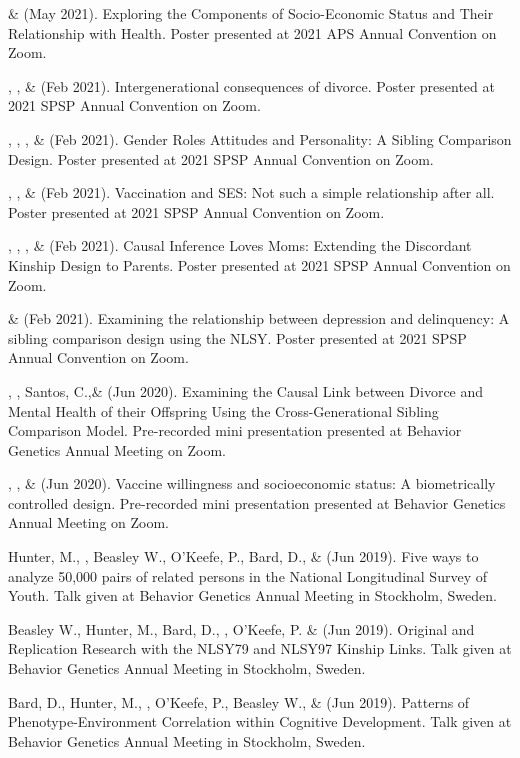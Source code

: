 %
\item \yrh \& \meb (May 2021). Exploring the Components of Socio-Economic Status and Their Relationship with Health. Poster presented at 2021 APS Annual Convention on Zoom.
%
\item \kl, \jt, \& \meb (Feb 2021). Intergenerational consequences of divorce. Poster presented at 2021 SPSP Annual Convention on Zoom.
%
\item \sherrym, \yrh, \jt, \& \meb (Feb 2021). Gender Roles Attitudes and Personality: A Sibling Comparison Design. Poster presented at 2021 SPSP Annual Convention on Zoom.
%
\item \jt, \kl, \& \meb (Feb 2021). Vaccination and SES: Not such a simple relationship after all. Poster presented at 2021 SPSP Annual Convention on Zoom.
%
\item \meb, \emsims, \jt, \& \kl  (Feb 2021). Causal Inference Loves Moms: Extending the Discordant Kinship Design to Parents. Poster presented at 2021 SPSP Annual Convention on Zoom.
%
\item \emsims\hspace* {2 pt} \& \meb (Feb 2021). Examining the relationship between depression and delinquency: A sibling comparison design using the NLSY. Poster presented at 2021 SPSP Annual Convention on Zoom.

\item \kl, \jt, Santos, C.,\noteB \& \meb (Jun 2020). Examining the Causal Link between Divorce and Mental Health of their Offspring Using the Cross-Generational Sibling Comparison Model. Pre-recorded mini presentation presented at Behavior Genetics Annual Meeting on Zoom.
%
\item \jt, \kl, \& \meb (Jun 2020). Vaccine willingness and socioeconomic status: A biometrically controlled design. Pre-recorded mini presentation presented at Behavior Genetics Annual Meeting on Zoom. 
%
\item Hunter, M., \meb, Beasley W., O'Keefe, P.,  Bard, D., \& \Joe (Jun 2019). Five ways to analyze 50,000 pairs of related persons in the National Longitudinal Survey of Youth. Talk given at Behavior Genetics Annual Meeting in Stockholm, Sweden. 

\item Beasley W., Hunter, M., Bard, D., \meb, O'Keefe, P. \&  \Joe (Jun 2019). Original and Replication Research with the NLSY79 and NLSY97 Kinship Links. Talk given at Behavior Genetics Annual Meeting in Stockholm, Sweden. 
%
\item Bard, D., Hunter, M., \meb, O'Keefe, P., Beasley W.,  \&  \Joe (Jun 2019). Patterns of Phenotype-Environment Correlation within Cognitive Development. Talk given at Behavior Genetics Annual Meeting in Stockholm, Sweden. 

